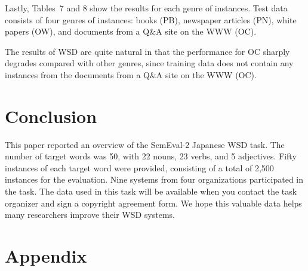 \documentclass[english]{jnlp_1.4}
\begin{document}
Lastly, Tables~7 and 8 show the results for each genre of
instances. Test data consists of four genres of instances: books (PB),
newspaper articles (PN), white papers (OW), and documents from a Q\&A
site on the WWW (OC).

The results of WSD are quite natural in that the performance for OC
sharply degrades compared with other genres, since training data does
not contain any instances from the documents from a Q\&A site on the
WWW (OC).

\begin{table}[t]
\setlength{\captionwidth}{200pt}
\begin{minipage}[t]{200pt}

\end{minipage}
\hfill
\begin{minipage}[t]{200pt}

\end{minipage}
\end{table}



\section{Conclusion}

This paper reported an overview of the SemEval-2 Japanese WSD
task. The number of target words was 50, with 22 nouns, 23 verbs, and
5 adjectives. Fifty instances of each target word were provided,
consisting of a total of 2,500 instances for the evaluation. Nine
systems from four organizations participated in the task.
The data used in this task will be available when you contact the
task organizer and sign a copyright agreement form. We hope this
valuable data helps many researchers improve their WSD systems.



\section*{Appendix}
\end{document}
